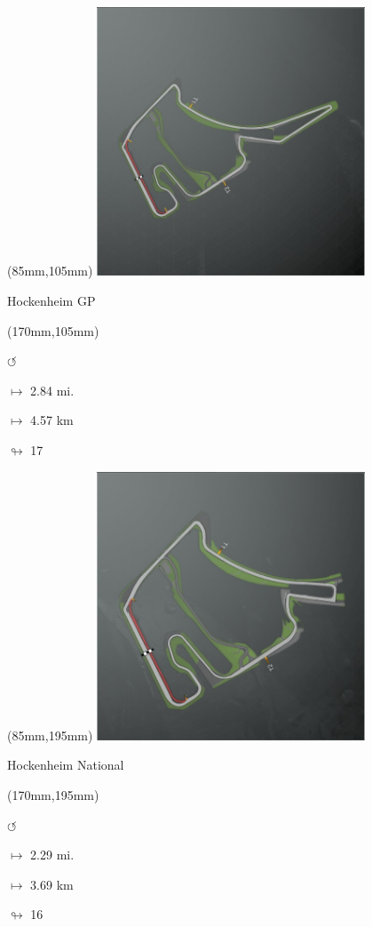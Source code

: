 \begin{textblock*}{80mm}(85mm,105mm)%
\includegraphics[width=80mm]{TR/2015-05-20_00027.png}
\centerline{Hockenheim GP}
\end{textblock*}
\begin{textblock*}{30mm}(170mm,105mm)%
\par \Huge$\circlearrowleft$
\Large
\par$\mapsto$ 2.84 mi.
\par$\mapsto$ 4.57 km
\par$\looparrowright$ 17
\end{textblock*}
\begin{textblock*}{80mm}(85mm,195mm)%
\includegraphics[width=80mm]{TR/2015-05-20_00028.png}
\centerline{Hockenheim National}
\end{textblock*}
\begin{textblock*}{30mm}(170mm,195mm)%
\par \Huge$\circlearrowleft$
\Large
\par$\mapsto$ 2.29 mi.
\par$\mapsto$ 3.69 km
\par$\looparrowright$ 16
\end{textblock*}
\null\newpage

